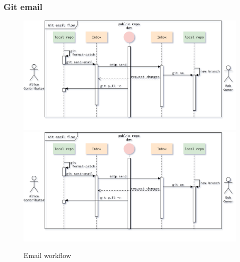 \begin{frame}[noframenumbering]
    \frametitle{Git email}
    \addtocounter{page}{-1}
    \begin{figure}
        \begin{center}
            {
                \includegraphics[height=0.7\textheight,keepaspectratio]{./images/EmailWorkflow_UpdateLocalRepository.png}
            }
            {
                \includegraphics[height=0.75\textheight,keepaspectratio]{./images/EmailWorkflow_UpdateLocalRepository.png}
            }
            \caption{Email workflow}
        \end{center}
    \end{figure}
\end{frame}

